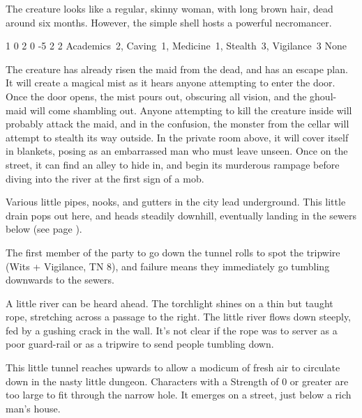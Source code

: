 The creature looks like a regular, skinny woman, with long brown hair, dead around six months.
However, the simple shell hosts a powerful necromancer.


  {1}%
  {0}%
  {{2}%
  {0}%
  {-5}}%
  {2}%
  {2}%
  {Academics~2, Caving~1, Medicine~1, Stealth~3, Vigilance~3}%
  {None}%
  {
    \setcounter{Air}{2}
    \setcounter{Fate}{2}
    \setcounter{Water}{3}
  }

The creature has already risen the maid from the dead, and has an escape plan.
It will create a magical mist as it hears anyone attempting to enter the door.
Once the door opens, the mist pours out, obscuring all vision, and the ghoul-maid will come shambling out.
Anyone attempting to kill the creature inside will probably attack the maid, and in the confusion, the monster from the cellar will attempt to stealth its way outside.
In the private room above, it will cover itself in blankets, posing as an embarrassed man who must leave unseen.
Once on the street, it can find an alley to hide in, and begin its murderous rampage before diving into the river at the first sign of a mob.



Various little pipes, nooks, and gutters in the city lead underground.
This little drain pops out here, and heads steadily downhill, eventually landing in the sewers below (see page \pageref{sewerPig}).

The first member of the party to go down the tunnel rolls to spot the tripwire (Wits + Vigilance, TN 8), and failure means they immediately go tumbling downwards to the sewers.

\begin{boxtext}

  A little river can be heard ahead.
  The torchlight shines on a thin but taught rope, stretching across a passage to the right.
  The little river flows down steeply, fed by a gushing crack in the wall.
  It's not clear if the rope was to server as a poor guard-rail or as a tripwire to send people tumbling down.

\end{boxtext}


This little tunnel reaches upwards to allow a modicum of fresh air to circulate down in the nasty little dungeon.  Characters with a Strength of 0 or greater are too large to fit through the narrow hole.  It emerges on a street, just below a rich man's house.

